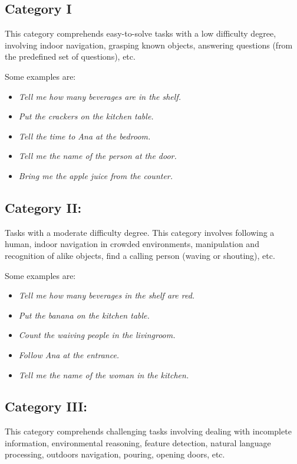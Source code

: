 \subsection{Category I}
\label{chap:gpsr-appendix-cat1}
This category comprehends easy-to-solve tasks with a low difficulty degree, involving indoor navigation, grasping known objects, answering questions (from the predefined set of questions), etc.

Some examples are:
\begin{itemize}
	\item \textit{Tell me how many beverages are in the shelf.}
	\item \textit{Put the crackers on the kitchen table.}
	\item \textit{Tell the time to Ana at the bedroom.}
	\item \textit{Tell me the name of the person at the door.}
	\item \textit{Bring me the apple juice from the counter.}
\end{itemize}

\subsection{Category II:}
\label{chap:gpsr-appendix-cat2}
Tasks with a moderate difficulty degree. This category involves following a human, indoor navigation in crowded environments, manipulation and recognition of alike objects, find a calling person (waving or shouting), etc. 

Some examples are:
\begin{itemize}
	\item \textit{Tell me how many beverages in the shelf are red.}
	\item \textit{Put the banana on the kitchen table.}
	\item \textit{Count the waiving people in the livingroom.}
	\item \textit{Follow Ana at the entrance.}
	\item \textit{Tell me the name of the woman in the kitchen.}
\end{itemize}


\subsection{Category III:}
\label{chap:gpsr-appendix-cat3}
This category comprehends challenging tasks involving dealing with incomplete information, environmental reasoning, feature detection, natural language processing, outdoors navigation, pouring, opening doors, etc.

